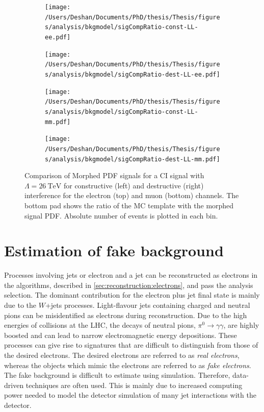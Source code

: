 \begin{figure}[h!]
    \centering
    \begin{subfigure}[b]{0.49\textwidth}
        \centering
        \texttt{[image: /Users/Deshan/Documents/PhD/thesis/Thesis/figures/analysis/bkgmodel/sigCompRatio-const-LL-ee.pdf]}
        \label{fig:bkgmodel:ratioMorphee1}
    \end{subfigure}
    \begin{subfigure}[b]{0.49\textwidth}
        \centering
        \texttt{[image: /Users/Deshan/Documents/PhD/thesis/Thesis/figures/analysis/bkgmodel/sigCompRatio-dest-LL-ee.pdf]}
        \label{fig:bkgmodel:ratioMorphee2}
    \end{subfigure}
    \begin{subfigure}[b]{0.49\textwidth}
        \centering
        \texttt{[image: /Users/Deshan/Documents/PhD/thesis/Thesis/figures/analysis/bkgmodel/sigCompRatio-const-LL-mm.pdf]}
        \label{fig:bkgmodel:ratioMorphmm1}
    \end{subfigure}
    \begin{subfigure}[b]{0.49\textwidth}
        \centering
        \texttt{[image: /Users/Deshan/Documents/PhD/thesis/Thesis/figures/analysis/bkgmodel/sigCompRatio-dest-LL-mm.pdf]}
        \label{fig:bkgmodel:ratioMorphmm2}
    \end{subfigure}
    \caption[Comparison of morphed signal PDF with generated signal template]{Comparison of Morphed PDF signals for a CI signal with $\Lambda = \SI{26}{\tera\electronvolt}$ for constructive (left) and destructive (right) interference for the electron (top) and muon (bottom) channels. The bottom pad shows the ratio of the MC template with the morphed signal PDF. Absolute number of events is plotted in each bin.}
    \label{fig:bkgmodel:ratioMorph}
\end{figure}

\section{Estimation of fake background}\label{sec:datamc:fakes}
Processes involving jets or electron and a jet can be reconstructed as electrons in the algorithms, described in \cref{sec:reconstruction:electrons}, and pass the analysis selection. The dominant contribution for the electron plus jet final state is mainly due to the $W$+jets processes. Light-flavour jets containing charged and neutral pions can be misidentified as electrons during reconstruction. Due to the high energies of collisions at the LHC, the decays of neutral pions, $\pi^0 \rightarrow \gamma\gamma$, are highly boosted and can lead to narrow electromagnetic energy depositions. These processes can give rise to signatures that are difficult to distinguish from those of the desired electrons. The desired electrons are referred to as \emph{real electrons}, whereas the objects which mimic the electrons are referred to as \emph{fake electrons}. The fake background is difficult to estimate using simulation. Therefore, data-driven techniques are often used. This is mainly due to increased computing power needed to model the detector simulation of many jet interactions with the detector. 

